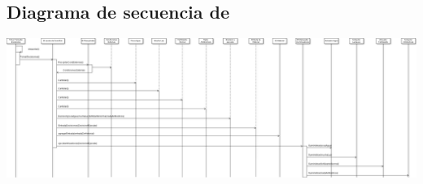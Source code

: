 \begin{landscape}
    \subsection{Diagrama de secuencia de \decisiones{}}
        \includegraphics[width=1.4\textwidth]{img/decisiones.png}

\end{landscape}
